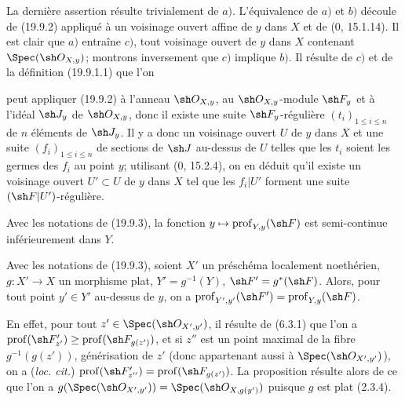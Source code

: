 La dernière assertion résulte trivialement de $a)$. L'équivalence de $a)$ et $b)$ découle de (19.9.2) appliqué à un voisinage ouvert affine de $y$ dans $X$ et de ($0$, 15.1.14). Il est clair que $a)$ entraîne $c)$, tout voisinage ouvert de $y$ dans $X$ contenant $\Spec(\sh O_{X,y})$; montrons inversement que $c)$ implique $b)$. Il résulte de $c)$ et de la définition (19.9.1.1) que l'on


peut appliquer (19.9.2) à l'anneau $\sh O_{X,y}$, au $\sh O_{X,y}$-module $\sh F_y$ et à l'idéal $\sh J_y$ de $\sh O_{X,y}$, donc il existe une suite $\sh F_y$-régulière $(t_i)_{1\leq i\leq n}$ de $n$ éléments de $\sh J_y$. Il y a donc un voisinage ouvert $U$ de $y$ dans $X$ et une suite $(f_i)_{1\leq i\leq n}$ de sections de $\sh J$ au-dessus de $U$ telles que les $t_i$ soient les germes des $f_i$ au point $y$; utilisant ($0$, 15.2.4), on en déduit qu'il existe un voisinage ouvert $U'\subset U$ de $y$ dans $X$ tel que les $f_i|U'$ forment une suite $(\sh F|U')$-régulière.

\begin{corollary}[19.9.4]
\label{IV.19.9.4}
Avec les notations de (19.9.3), la fonction $y\mapsto\operatorname{prof}_{Y,y}(\sh F)$ est semi-continue inférieurement dans $Y$.
\end{corollary}

\begin{proposition}[19.9.5]
\label{IV.19.9.5}
Avec les notations de (19.9.3), soient $X'$ un préschéma localement noethérien, $g:X'\to X$ un morphisme plat, $Y'=g^{-1}(Y)$, $\sh F'=g^*(\sh F)$. Alors, pour tout point $y'\in Y'$ au-dessus de $y$, on a $\operatorname{prof}_{Y',y'}(\sh F')=\operatorname{prof}_{Y,y}(\sh F)$.
\end{proposition}

En effet, pour tout $z'\in\Spec(\sh O_{X',y'})$, il résulte de (6.3.1) que l'on a $\operatorname{prof}(\sh F'_{z'})\geq\operatorname{prof}(\sh F_{g(z')})$, et si $z''$ est un point maximal de la fibre $g^{-1}(g(z'))$, générisation de $z'$ (donc appartenant aussi à $\Spec(\sh O_{X',y'})$), on a (\emph{loc. cit.}) $\operatorname{prof}(\sh F'_{z''})=\operatorname{prof}(\sh F_{g(z')})$. La proposition résulte alors de ce que l'on a $g(\Spec(\sh O_{X',y'}))=\Spec(\sh O_{X,g(y')})$ puisque $g$ est plat (2.3.4).

